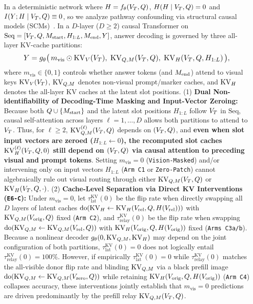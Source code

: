\begin{proposition}
\label{prop:bypass}
\label{subsec:prop2}
In a deterministic network where $H = f_\theta(V_T, Q)$, $H(H \mid V_T, Q) = 0$ and $I(Y; H \mid V_T, Q) \equiv 0$, so we analyze pathway confounding via structural causal models (SCMs)~\cite{geiger2021causal}. In a $D$-layer ($D \ge 2$) causal Transformer on $\mathrm{Seq} = [V_T, Q, M_{\mathrm{start}}, H_{1:L}, M_{\mathrm{end}}, Y]$, answer decoding is governed by three all-layer KV-cache partitions:
\begin{equation}
  \resizebox{0.88\linewidth}{!}{$\displaystyle Y = g_\theta\big(\, m_{\mathrm{vis}} \odot \KV_V(\VT),\; \KV_{Q,M}(\VT, Q),\; \KV_H(\VT, Q, H_{1:L}) \,\big),$}
  \label{eq:scm}
\end{equation}
where $m_{\mathrm{vis}} \in \{0, 1\}$ controls whether answer tokens (and $M_{\mathrm{end}}$) attend to visual keys $\mathrm{KV}_V(V_T)$, $\mathrm{KV}_{Q,M}$ denotes non-visual prompt/marker caches, and $\mathrm{KV}_H$ denotes the all-layer KV caches at the latent slot positions.
(1) \textbf{Dual Non-identifiability of Decoding-Time Masking and Input-Vector Zeroing:} Because both $Q \cup \{M_{\mathrm{start}}\}$ and the latent slot positions $H_{1:L}$ follow $V_T$ in $\mathrm{Seq}$, causal self-attention across layers $\ell = 1, \dots, D$ allows both partitions to attend to $V_T$. Thus, for $\ell \ge 2$, $\mathrm{KV}_{Q,M}^{(\ell)}(V_T, Q)$ depends on $(V_T, Q)$, and \textbf{even when slot input vectors are zeroed ($H_{1:L} \leftarrow 0$), the recomputed slot caches $\mathrm{KV}_H^{(\ell)}(V_T, Q, 0)$ still depend on $(V_T, Q)$ via causal attention to preceding visual and prompt tokens}. Setting $m_{\mathrm{vis}} = 0$ (\texttt{Vision-Masked}) and/or intervening only on input vectors $H_{1:L}$ (\texttt{Arm C1} or \texttt{Zero-Patch}) cannot algebraically rule out visual routing through either $\mathrm{KV}_{Q,M}(V_T, Q)$ or $\mathrm{KV}_H(V_T, Q, \cdot)$.
(2) \textbf{Cache-Level Separation via Direct KV Interventions (\texttt{E6-C}):} Under $m_{\mathrm{vis}} = 0$, let $\tau_{\mathrm{lat}}^{\mathrm{KV}}(0)$ be the flip rate when directly swapping all $D$ layers of latent caches $\mathrm{do}(\mathrm{KV}_H \leftarrow \mathrm{KV}_H(V_{\mathrm{rel}}, Q, H(V_{\mathrm{rel}})))$ with $\mathrm{KV}_{Q,M}(V_{\mathrm{orig}}, Q)$ fixed (\texttt{Arm C2}), and $\tau_{\mathrm{relay}}^{\mathrm{KV}}(0)$ be the flip rate when swapping $\mathrm{do}(\mathrm{KV}_{Q,M} \leftarrow \mathrm{KV}_{Q,M}(V_{\mathrm{rel}}, Q))$ with $\mathrm{KV}_H(V_{\mathrm{orig}}, Q, H(V_{\mathrm{orig}}))$ fixed (\texttt{Arms C3a/b}). Because a nonlinear decoder $g_\theta(0, \mathrm{KV}_{Q,M}, \mathrm{KV}_H)$ may depend on the joint configuration of both partitions, $\tau_{\mathrm{lat}}^{\mathrm{KV}}(0) = 0$ does not logically entail $\tau_{\mathrm{relay}}^{\mathrm{KV}}(0) = 100\%$. However, if empirically $\tau_{\mathrm{lat}}^{\mathrm{KV}}(0) = 0$ while $\tau_{\mathrm{relay}}^{\mathrm{KV}}(0)$ matches the all-visible donor flip rate and blinding $\mathrm{KV}_{Q,M}$ via a black prefill image $\mathrm{do}(\mathrm{KV}_{Q,M} \leftarrow \mathrm{KV}_{Q,M}(V_{\mathrm{zero}}, Q))$ while retaining $\mathrm{KV}_H(V_{\mathrm{orig}}, Q, H(V_{\mathrm{orig}}))$ (\texttt{Arm C4}) collapses accuracy, these interventions jointly establish that $m_{\mathrm{vis}}=0$ predictions are driven predominantly by the prefill relay $\mathrm{KV}_{Q,M}(V_T, Q)$.
\end{proposition}

